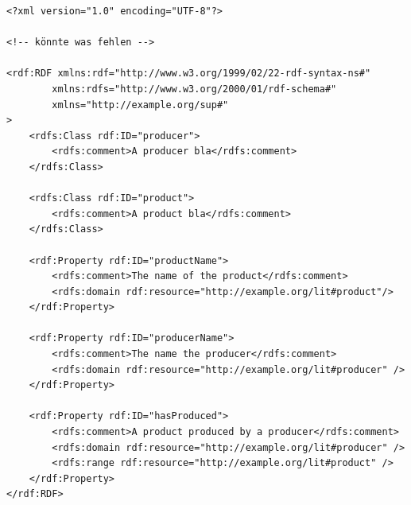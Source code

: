 \documentclass[fontset=windows]{article}
\begin{document}
\begin{verbatim}
<?xml version="1.0" encoding="UTF-8"?>

<!-- könnte was fehlen -->

<rdf:RDF xmlns:rdf="http://www.w3.org/1999/02/22-rdf-syntax-ns#"
        xmlns:rdfs="http://www.w3.org/2000/01/rdf-schema#"
        xmlns="http://example.org/sup#"
>
  	<rdfs:Class rdf:ID="producer">
      	<rdfs:comment>A producer bla</rdfs:comment>
  	</rdfs:Class>

  	<rdfs:Class rdf:ID="product">
      	<rdfs:comment>A product bla</rdfs:comment>
  	</rdfs:Class>

  	<rdf:Property rdf:ID="productName">
      	<rdfs:comment>The name of the product</rdfs:comment>
      	<rdfs:domain rdf:resource="http://example.org/lit#product"/>
  	</rdf:Property>

  	<rdf:Property rdf:ID="producerName">
      	<rdfs:comment>The name the producer</rdfs:comment>
      	<rdfs:domain rdf:resource="http://example.org/lit#producer" />
  	</rdf:Property>

  	<rdf:Property rdf:ID="hasProduced">
      	<rdfs:comment>A product produced by a producer</rdfs:comment>
      	<rdfs:domain rdf:resource="http://example.org/lit#producer" />
      	<rdfs:range rdf:resource="http://example.org/lit#product" />
  	</rdf:Property>
</rdf:RDF>
\end{verbatim}
\end{document}
